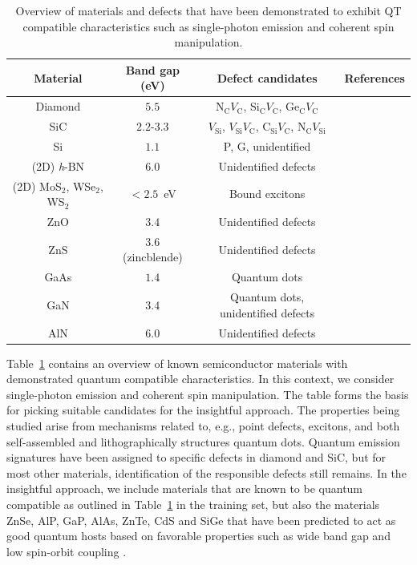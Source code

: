 \documentclass[superscriptaddress,unsortedaddress,
 amsmath,amssymb,
 aps,
]{revtex4-2}
\begin{document}
\begin{table}[b]
    \centering 
    \caption{Overview of materials and defects that have been demonstrated to exhibit QT compatible characteristics such as single-photon emission and coherent spin manipulation.}
    \begin{tabular}{c|c|c|c}
    Material & Band gap (eV) & Defect candidates & References \\
    \hline
    Diamond  & $5.5$  & N$_\mathrm{C}V_\mathrm{C}$, Si$_\mathrm{C}V_\mathrm{C}$, Ge$_\mathrm{C}V_\mathrm{C}$ & \cite{Taylor2008,Balasubramanian_2009,Barclay2011,Gordon2013,Rogers_2014,Bhaskar_2018} \\ 
    SiC & $2.2$-$3.3$ & $V_\mathrm{Si}$, $V_\mathrm{Si}V_\mathrm{C}$, C$_\mathrm{Si}V_\mathrm{C}$, N$_\mathrm{C}V_\mathrm{Si}$ & \cite{Widmann2014,Christle_2015,Castelletto_2014,Zargaleh_2018}  \cite{Weber2010, Son2020, Falk2013} \\ 
    Si & $1.1$ & P, G, unidentified & \cite{Muhonen_2014,Durand_2020,Redjem2020} \\ 
    (2D) \textit{h}-BN & $6.0$ & Unidentified defects & \cite{Tran_2016,Tran_2016b,Hayee_2020} \\ 
    (2D) MoS$_2$, WSe$_2$, WS$_2$ & $<2.5$~eV & Bound excitons & \cite{Toth2019} \\
    ZnO & $3.4$ & Unidentified defects & \cite{Morfa2012} \\ 
    ZnS & $3.6$ (zincblende) & Unidentified defects & \cite{Stewart2019} \\ 
    GaAs & $1.4$ & Quantum dots & \cite{Bluhm2010} \\ 
    GaN & $3.4$ & Quantum dots, unidentified defects & \cite{Roux2017,Berhane2018} \\
    AlN & $6.0$ & Unidentified defects & \cite{Xue2020}\\
    \end{tabular}
    \label{tab:qt-materials}
\end{table} 

Table~\ref{tab:qt-materials} contains an overview of known semiconductor materials with demonstrated quantum compatible characteristics. In this context, we consider single-photon emission and coherent spin manipulation.   
The table forms the basis for picking suitable candidates for the insightful approach. 
The properties being studied arise from mechanisms related to, e.g., point defects, excitons, and both self-assembled and lithographically structures quantum dots. 
Quantum emission signatures have been assigned to specific defects in diamond and SiC, but for most other materials, identification of the responsible defects still remains. 
In the insightful approach, we include materials that are known to be quantum compatible as outlined in Table~\ref{tab:qt-materials} in the training set, but also the materials ZnSe, AlP, GaP, AlAs, ZnTe, CdS and SiGe that have been predicted to act as good quantum hosts based on favorable properties such as wide band gap and low spin-orbit coupling \cite{Weber2010,Hardy2019}. 
\end{document}
